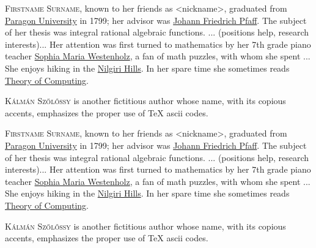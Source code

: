 \begin{tocaboutauthors}
\begin{tocabout}[coladangelo]  %
  \textsc{Firstname Surname}, known to her friends as <nickname>,
  graduated from
  \href{https://en.wikipedia.org/wiki/URL}{Paragon University} in
  1799; her advisor was
  \href{https://en.wikipedia.org/wiki/Johann_Friedrich_Pfaff}{Johann
    Friedrich Pfaff}. The subject of her thesis was integral rational
    algebraic functions.  ... (positions help, research interests)...
    Her attention was first turned to mathematics by her 7th grade
    piano teacher \href{http://url}{Sophia Maria Westenholz},
    a fan of math puzzles, with whom she spent ...  
    She enjoys hiking in the
   \href{https://en.wikipedia.org/wiki/Nilgiri_Mountains/}{Nilgiri Hills}.
    In her spare time she sometimes reads
  \href{http://theoryofcomputing.org}{\textsf{Theory of Computing}}.
\end{tocabout}
\begin{tocabout}[grilo]
\textsc{K\'alm\'an Sz\H{o}l\H{o}ssy} is another fictitious author
whose name, with its copious accents, emphasizes the proper use
of TeX ascii codes.
\end{tocabout}
\begin{tocabout}[jeffery]  %
  \textsc{Firstname Surname}, known to her friends as <nickname>,
  graduated from
  \href{https://en.wikipedia.org/wiki/URL}{Paragon University} in
  1799; her advisor was
  \href{https://en.wikipedia.org/wiki/Johann_Friedrich_Pfaff}{Johann
    Friedrich Pfaff}. The subject of her thesis was integral rational
    algebraic functions.  ... (positions help, research interests)...
    Her attention was first turned to mathematics by her 7th grade
    piano teacher \href{http://url}{Sophia Maria Westenholz},
    a fan of math puzzles, with whom she spent ...  
    She enjoys hiking in the
   \href{https://en.wikipedia.org/wiki/Nilgiri_Mountains/}{Nilgiri Hills}.
    In her spare time she sometimes reads
  \href{http://theoryofcomputing.org}{\textsf{Theory of Computing}}.
\end{tocabout}
\begin{tocabout}[vidick]
\textsc{K\'alm\'an Sz\H{o}l\H{o}ssy} is another fictitious author
whose name, with its copious accents, emphasizes the proper use
of TeX ascii codes.
\end{tocabout}
\end{tocaboutauthors}




